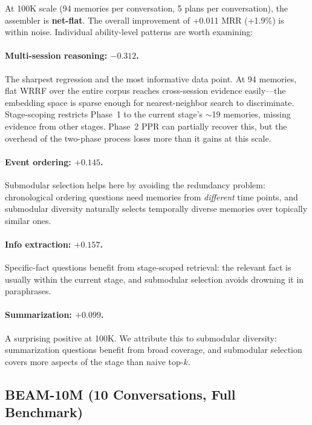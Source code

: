 \documentclass[11pt]{article}
\begin{document}
At 100K scale (94 memories per conversation, 5 plans per
conversation), the assembler is \textbf{net-flat}.  The overall
improvement of +0.011 MRR (+1.9\%) is within noise.  Individual
ability-level patterns are worth examining:

\paragraph{Multi-session reasoning: $-0.312$.}
The sharpest regression and the most informative data point.  At 94
memories, flat WRRF over the entire corpus reaches cross-session
evidence easily---the embedding space is sparse enough for
nearest-neighbor search to discriminate.  Stage-scoping restricts
Phase~1 to the current stage's $\sim$19 memories, missing evidence
from other stages.  Phase~2 PPR can partially recover this, but the
overhead of the two-phase process loses more than it gains at this
scale.

\paragraph{Event ordering: $+0.145$.}
Submodular selection helps here by avoiding the redundancy problem:
chronological ordering questions need memories from \emph{different}
time points, and submodular diversity naturally selects temporally
diverse memories over topically similar ones.

\paragraph{Info extraction: $+0.157$.}
Specific-fact questions benefit from stage-scoped retrieval: the
relevant fact is usually within the current stage, and submodular
selection avoids drowning it in paraphrases.

\paragraph{Summarization: $+0.099$.}
A surprising positive at 100K.  We attribute this to submodular
diversity: summarization questions benefit from broad coverage, and
submodular selection covers more aspects of the stage than naive
top-$k$.

\subsection{BEAM-10M (10 Conversations, Full Benchmark)}
\label{sec:results-10m}
\end{document}

